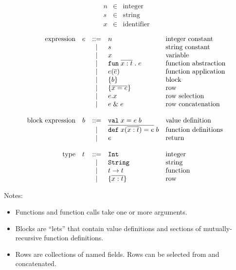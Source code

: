\documentclass[11pt]{article}
\newcommand{\kw}[1]{\mathtt{#1}}
\begin{document}
\newcommand{\funty}[2]{#1 -> #2}
\newcommand{\intty}{\kw{Int}}
\newcommand{\rowty}[2]{\{ \rep{#1 : #2} \}}
\newcommand{\strty}{\kw{String}}

\[
\begin{array}{lcl}
n & \in & \text{integer} \\
s & \in & \text{string} \\
x & \in & \text{identifier} \\
\end{array}
\]
\[
\begin{array}{rlcll}
\text{expression}
  & e & ::= & \nume{n}                      & \text{integer constant} \\
  &   & |   & \stre{s}                      & \text{string constant} \\
  &   & |   & \vare{x}                      & \text{variable} \\
  &   & |   & \fune{\rep{\arge{x}{t}}}{e}   & \text{function abstraction} \\
  &   & |   & \appe{e}{\rep{e}}             & \text{function application} \\
  &   & |   & \blke{b}                      & \text{block} \\
  &   & |   & \rowe{x}{e}                   & \text{row} \\
  &   & |   & \sele{e}{x}                   & \text{row selection} \\
  &   & |   & \ande{e}{e}                   & \text{row concatenation} \\
\\
\text{block expression}
  & b & ::= & \valdef{x}{e}{b}              & \text{value definition} \\
  &   & |   & \fundef{\fd{x}{x}{t}{e}}{b}   & \text{function definitions} \\
  &   & |   & \return{e}                    & \text{return} \\
\\
\text{type}
  & t & ::= & \intty       & \text{integer} \\
  &   & |   & \strty       & \text{string} \\
  &   & |   & \funty{t}{t} & \text{function} \\
  &   & |   & \rowty{x}{t} & \text{row} \\
\end{array}
\]

Notes:
\begin{itemize}
\item Functions and function calls take one or more arguments.
\item Blocks are ``lets'' that contain value definitions and sections of mutually-recursive function definitions.
\item Rows are collections of named fields. Rows can be selected from and concatenated.
\end{itemize}
\end{document}
